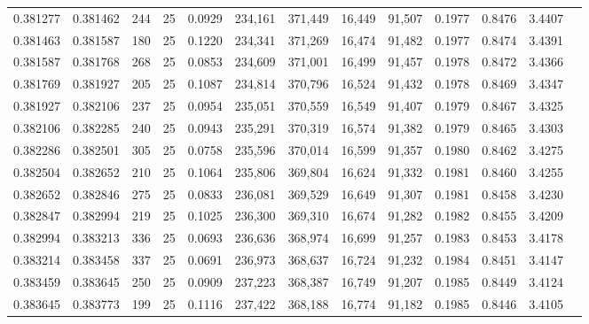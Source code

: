 \begin{tabular}{rrrrrrrrrrrrr}
0.381277 & 0.381462 &   244 &  25 &                                     0.0929 & 234,161 & 371,449 &  16,449 &  91,507 & 0.1977 & 0.8476 & 3.4407 \\
0.381463 & 0.381587 &   180 &  25 &                                     0.1220 & 234,341 & 371,269 &  16,474 &  91,482 & 0.1977 & 0.8474 & 3.4391 \\
0.381587 & 0.381768 &   268 &  25 &                                     0.0853 & 234,609 & 371,001 &  16,499 &  91,457 & 0.1978 & 0.8472 & 3.4366 \\
0.381769 & 0.381927 &   205 &  25 &                                     0.1087 & 234,814 & 370,796 &  16,524 &  91,432 & 0.1978 & 0.8469 & 3.4347 \\
0.381927 & 0.382106 &   237 &  25 &                                     0.0954 & 235,051 & 370,559 &  16,549 &  91,407 & 0.1979 & 0.8467 & 3.4325 \\
0.382106 & 0.382285 &   240 &  25 &                                     0.0943 & 235,291 & 370,319 &  16,574 &  91,382 & 0.1979 & 0.8465 & 3.4303 \\
0.382286 & 0.382501 &   305 &  25 &                                     0.0758 & 235,596 & 370,014 &  16,599 &  91,357 & 0.1980 & 0.8462 & 3.4275 \\
0.382504 & 0.382652 &   210 &  25 &                                     0.1064 & 235,806 & 369,804 &  16,624 &  91,332 & 0.1981 & 0.8460 & 3.4255 \\
0.382652 & 0.382846 &   275 &  25 &                                     0.0833 & 236,081 & 369,529 &  16,649 &  91,307 & 0.1981 & 0.8458 & 3.4230 \\
0.382847 & 0.382994 &   219 &  25 &                                     0.1025 & 236,300 & 369,310 &  16,674 &  91,282 & 0.1982 & 0.8455 & 3.4209 \\
0.382994 & 0.383213 &   336 &  25 &                                     0.0693 & 236,636 & 368,974 &  16,699 &  91,257 & 0.1983 & 0.8453 & 3.4178 \\
0.383214 & 0.383458 &   337 &  25 &                                     0.0691 & 236,973 & 368,637 &  16,724 &  91,232 & 0.1984 & 0.8451 & 3.4147 \\
0.383459 & 0.383645 &   250 &  25 &                                     0.0909 & 237,223 & 368,387 &  16,749 &  91,207 & 0.1985 & 0.8449 & 3.4124 \\
0.383645 & 0.383773 &   199 &  25 &                                     0.1116 & 237,422 & 368,188 &  16,774 &  91,182 & 0.1985 & 0.8446 & 3.4105 \\

\end{tabular}
